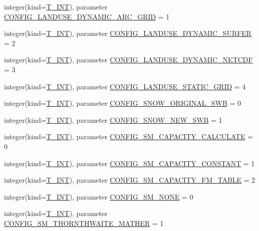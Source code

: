 \begin{DoxyCompactItemize}
\item 
integer(kind=\hyperlink{namespacetest_a6f91ebd89b58cfcc5da99faed9385c1e}{T\_\-INT}), parameter \hyperlink{namespacetest_ac65abaea28ba58903b2d4f2b096b661c}{CONFIG\_\-LANDUSE\_\-DYNAMIC\_\-ARC\_\-GRID} = 1
\item 
integer(kind=\hyperlink{namespacetest_a6f91ebd89b58cfcc5da99faed9385c1e}{T\_\-INT}), parameter \hyperlink{namespacetest_ab4d98418b10a5c419d3848523699bd61}{CONFIG\_\-LANDUSE\_\-DYNAMIC\_\-SURFER} = 2
\item 
integer(kind=\hyperlink{namespacetest_a6f91ebd89b58cfcc5da99faed9385c1e}{T\_\-INT}), parameter \hyperlink{namespacetest_aab4a8dc605bb8e9806d7678f36996890}{CONFIG\_\-LANDUSE\_\-DYNAMIC\_\-NETCDF} = 3
\item 
integer(kind=\hyperlink{namespacetest_a6f91ebd89b58cfcc5da99faed9385c1e}{T\_\-INT}), parameter \hyperlink{namespacetest_a3fa05e57e81cd6db482ec5db47f0de07}{CONFIG\_\-LANDUSE\_\-STATIC\_\-GRID} = 4
\item 
integer(kind=\hyperlink{namespacetest_a6f91ebd89b58cfcc5da99faed9385c1e}{T\_\-INT}), parameter \hyperlink{namespacetest_abb5d4895f4dc2885162f36d22c55a9df}{CONFIG\_\-SNOW\_\-ORIGINAL\_\-SWB} = 0
\item 
integer(kind=\hyperlink{namespacetest_a6f91ebd89b58cfcc5da99faed9385c1e}{T\_\-INT}), parameter \hyperlink{namespacetest_a04623d3a28add7da79b12fd14e1e1d7d}{CONFIG\_\-SNOW\_\-NEW\_\-SWB} = 1
\item 
integer(kind=\hyperlink{namespacetest_a6f91ebd89b58cfcc5da99faed9385c1e}{T\_\-INT}), parameter \hyperlink{namespacetest_ad70f8862ac83e4d0577411e6342c88ea}{CONFIG\_\-SM\_\-CAPACITY\_\-CALCULATE} = 0
\item 
integer(kind=\hyperlink{namespacetest_a6f91ebd89b58cfcc5da99faed9385c1e}{T\_\-INT}), parameter \hyperlink{namespacetest_a90bf5bc96833ab6c31224335e8d67784}{CONFIG\_\-SM\_\-CAPACITY\_\-CONSTANT} = 1
\item 
integer(kind=\hyperlink{namespacetest_a6f91ebd89b58cfcc5da99faed9385c1e}{T\_\-INT}), parameter \hyperlink{namespacetest_a6cb868053790c363d532022df302490f}{CONFIG\_\-SM\_\-CAPACITY\_\-FM\_\-TABLE} = 2
\item 
integer(kind=\hyperlink{namespacetest_a6f91ebd89b58cfcc5da99faed9385c1e}{T\_\-INT}), parameter \hyperlink{namespacetest_af5783c9f337e9b31e7749b7148302fe7}{CONFIG\_\-SM\_\-NONE} = 0
\item 
integer(kind=\hyperlink{namespacetest_a6f91ebd89b58cfcc5da99faed9385c1e}{T\_\-INT}), parameter \hyperlink{namespacetest_afe87139521a8c470b4594a41125b1800}{CONFIG\_\-SM\_\-THORNTHWAITE\_\-MATHER} = 1

\end{DoxyCompactItemize}

